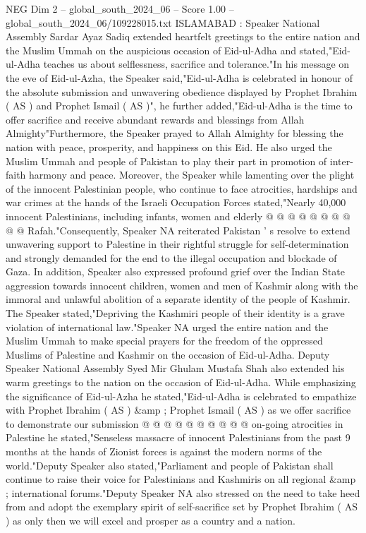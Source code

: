 \begin{textsample}{NEG Dim 2 – global\_south\_2024\_06 – Score 1.00 – global\_south\_2024\_06/109228015.txt}  \label{ex:f2_neg_395}
ISLAMABAD : Speaker National Assembly Sardar Ayaz Sadiq extended heartfelt greetings to the entire nation and the Muslim Ummah on the auspicious occasion of Eid-ul-Adha and stated,"Eid-ul-Adha teaches us about selflessness, sacrifice and tolerance."In his message on the eve of Eid-ul-Azha, the Speaker said,"Eid-ul-Adha is celebrated in honour of the absolute submission and unwavering obedience displayed by Prophet Ibrahim ( AS ) and Prophet Ismail ( AS )", he further added,"Eid-ul-Adha is the time to offer sacrifice and receive abundant rewards and blessings from Allah Almighty"Furthermore, the Speaker prayed to Allah Almighty for blessing the nation with peace, prosperity, and happiness on this Eid.
He also urged the Muslim Ummah and people of Pakistan to play their part in promotion of inter-faith harmony and peace.
Moreover, the Speaker while lamenting over the plight of the innocent Palestinian people, who continue to face atrocities, hardships and war crimes at the hands of the Israeli Occupation Forces stated,"Nearly 40,000 innocent Palestinians, including infants, women and elderly @ @ @ @ @ @ @ @ @ @ Rafah."Consequently, Speaker NA reiterated Pakistan ' s resolve to extend unwavering support to Palestine in their rightful struggle for self-determination and strongly demanded for the end to the illegal occupation and blockade of Gaza.
In addition, Speaker also expressed profound grief over the Indian State aggression towards innocent children, women and men of Kashmir along with the immoral and unlawful abolition of a separate identity of the people of Kashmir.
The Speaker stated,"Depriving the Kashmiri people of their identity is a grave violation of international law."Speaker NA urged the entire nation and the Muslim Ummah to make special prayers for the freedom of the oppressed Muslims of Palestine and Kashmir on the occasion of Eid-ul-Adha.
Deputy Speaker National Assembly Syed Mir Ghulam Mustafa Shah also extended his warm greetings to the nation on the occasion of Eid-ul-Adha.
While emphasizing the significance of Eid-ul-Azha he stated,"Eid-ul-Adha is celebrated to empathize with Prophet Ibrahim ( AS ) \&amp ; Prophet Ismail ( AS ) as we offer sacrifice to demonstrate our submission @ @ @ @ @ @ @ @ @ @ on-going atrocities in Palestine he stated,"Senseless massacre of innocent Palestinians from the past 9 months at the hands of Zionist forces is against the modern norms of the world."Deputy Speaker also stated,"Parliament and people of Pakistan shall continue to raise their voice for Palestinians and Kashmiris on all regional \&amp ; international forums."Deputy Speaker NA also stressed on the need to take heed from and adopt the exemplary spirit of self-sacrifice set by Prophet Ibrahim ( AS ) as only then we will excel and prosper as a country and a nation.

\end{textsample}
